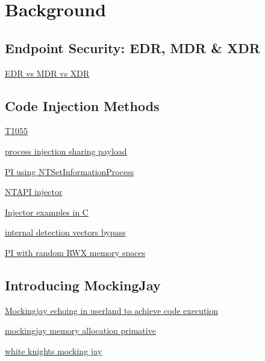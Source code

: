 \section{Background}

\subsection{Endpoint Security: EDR, MDR \& XDR}

\href{https://www.crowdstrike.com/cybersecurity-101/endpoint-security/edr-vs-mdr-vs-xdr/}{EDR vs MDR vs XDR}


\subsection{Code Injection Methods}

\href{https://attack.mitre.org/techniques/T1055/}{T1055}

\href{https://modexp.wordpress.com/2018/07/15/process-injection-sharing-payload/}{process injection sharing payload}

\href{https://www.riskinsight-wavestone.com/en/2023/10/process-injection-using-ntsetinformationprocess/}{PI using NTSetInformationProcess}

\href{https://github.com/elddy/Windows-NTAPI-Injector}{NTAPI injector}

\href{https://gist.github.com/WKL-Sec/96e17188e4c159c2cdf7ff2c111130cc#file-local-c}{Injector examples in C}

\href{https://www.unknowncheats.me/forum/anti-cheat-bypass/286274-internal-detection-vectors-bypass.html}{internal detection vectors bypass}

\href{https://medium.com/@s12deff/process-injection-with-random-rwx-memory-spaces-3e3651149527}{PI with random RWX memory spaces}

\subsection{Introducing MockingJay}

\href{https://www.securityjoes.com/post/process-mockingjay-echoing-rwx-in-userland-to-achieve-code-execution}{Mockingjay echoing in userland to achieve code execution}

\href{https://www.linkedin.com/posts/john-stigerwalt-90a9b4110_mockingjay-memory-allocation-primitive-activity-7083050050158743552-Hgyw}{mockingjay memory allocation primative}

\href{https://whiteknightlabs.com/2023/07/06/mockingjay-memory-allocation-primitive/}{white knights mocking jay}

